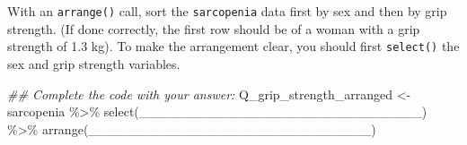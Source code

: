 \documentclass[
  letterpaper,
  DIV=11,
  numbers=noendperiod]{scrreprt}
\newenvironment{Shaded}{\begin{snugshade}}{\end{snugshade}}
\newcommand{\DocumentationTok}[1]{\textcolor[rgb]{0.37,0.37,0.37}{\textit{#1}}}
\newcommand{\FunctionTok}[1]{\textcolor[rgb]{0.28,0.35,0.67}{#1}}
\newcommand{\NormalTok}[1]{\textcolor[rgb]{0.00,0.23,0.31}{#1}}
\newcommand{\OtherTok}[1]{\textcolor[rgb]{0.00,0.23,0.31}{#1}}
\newcommand{\SpecialCharTok}[1]{\textcolor[rgb]{0.37,0.37,0.37}{#1}}
\begin{document}
\begin{tcolorbox}[enhanced jigsaw, colframe=quarto-callout-tip-color-frame, rightrule=.15mm, opacityback=0, breakable, coltitle=black, colbacktitle=quarto-callout-tip-color!10!white, bottomrule=.15mm, leftrule=.75mm, toprule=.15mm, arc=.35mm, bottomtitle=1mm, colback=white, left=2mm, opacitybacktitle=0.6, titlerule=0mm, title=\textcolor{quarto-callout-tip-color}{\faLightbulb}\hspace{0.5em}{Practice}, toptitle=1mm]

With an \texttt{arrange()} call, sort the \texttt{sarcopenia} data first
by sex and then by grip strength. (If done correctly, the first row
should be of a woman with a grip strength of 1.3 kg). To make the
arrangement clear, you should first \texttt{select()} the sex and grip
strength variables.

\begin{Shaded}
\begin{Highlighting}[]
\DocumentationTok{\#\# Complete the code with your answer:}
\NormalTok{Q\_grip\_strength\_arranged }\OtherTok{\textless{}{-}} 
\NormalTok{  sarcopenia }\SpecialCharTok{\%\textgreater{}\%} 
  \FunctionTok{select}\NormalTok{(\_\_\_\_\_\_\_\_\_\_\_\_\_\_\_\_\_\_\_\_\_\_\_\_\_\_\_\_\_\_) }\SpecialCharTok{\%\textgreater{}\%} 
  \FunctionTok{arrange}\NormalTok{(\_\_\_\_\_\_\_\_\_\_\_\_\_\_\_\_\_\_\_\_\_\_\_\_\_\_\_\_\_\_)}
\end{Highlighting}
\end{Shaded}

\end{tcolorbox}
\end{document}

